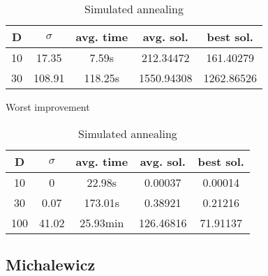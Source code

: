 \documentclass{article}
\begin{document}
\begin{table}[!htbp]
\begin{minipage}{.4\linewidth}
    \centering

    \begin{tabular}{|c|c|c|c|c|}
    \hline
    D   & $\sigma$  & avg. time     & avg. sol.     & best sol. \\
    \hline
    10  & 17.35     & 7.59s         & 212.34472     & 161.40279 \\
    \hline
    30  & 108.91    & 118.25s       & 1550.94308    & 1262.86526 \\
    \hline
    \end{tabular}
    \caption{Worst improvement}
  \end{minipage}%
  \quad %
  \begin{minipage}{.75\linewidth}
    \centering

    \begin{tabular}{|c|c|c|c|c|}
    \hline
    D   & $\sigma$  & avg. time     & avg. sol.     & best sol. \\
    \hline
    10  & 0         & 22.98s        & 0.00037       & 0.00014 \\
    \hline
    30  & 0.07      & 173.01s       & 0.38921       & 0.21216 \\
    \hline
    100 & 41.02     & 25.93min      & 126.46816     & 71.91137 \\
    \hline
    \end{tabular}
    \caption{Simulated annealing}
  \end{minipage}
\end{table}

\newpage
\setcounter{table}{0}


\subsection{Michalewicz}
\end{document}
